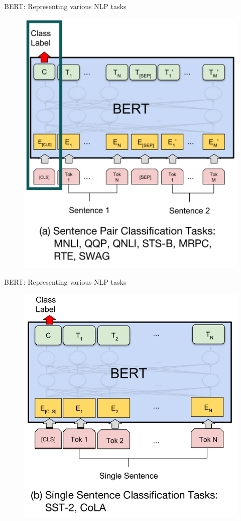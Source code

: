 \documentclass[12pt,aspectratio=169,handout]{beamer}
\begin{document}
\begin{frame}{BERT: Representing various NLP tasks}
	
	\begin{figure}
		\includegraphics[width=0.5\linewidth]{img/task1.png}
	\end{figure}


	
\end{frame}



\begin{frame}{BERT: Representing various NLP tasks}
	
	\begin{figure}
		\includegraphics[width=0.6\linewidth]{img/task2.png}
	\end{figure}
	
	
\end{frame}
\end{document}
